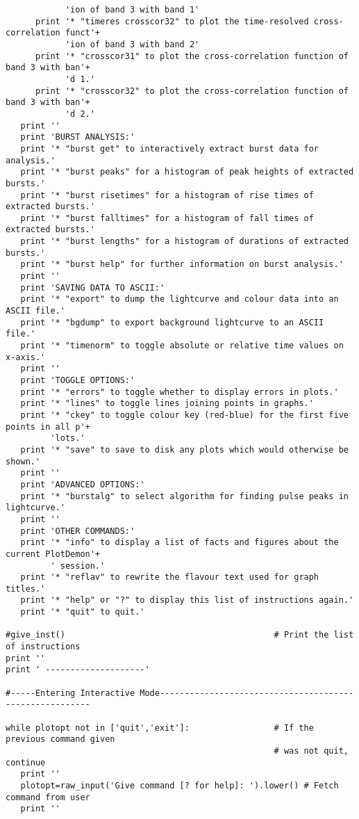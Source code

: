 \begin{verbatim}
            'ion of band 3 with band 1'
      print '* "timeres crosscor32" to plot the time-resolved cross-correlation funct'+
            'ion of band 3 with band 2'
      print '* "crosscor31" to plot the cross-correlation function of band 3 with ban'+
            'd 1.'
      print '* "crosscor32" to plot the cross-correlation function of band 3 with ban'+
            'd 2.'
   print ''
   print 'BURST ANALYSIS:'
   print '* "burst get" to interactively extract burst data for analysis.'
   print '* "burst peaks" for a histogram of peak heights of extracted bursts.'
   print '* "burst risetimes" for a histogram of rise times of extracted bursts.'
   print '* "burst falltimes" for a histogram of fall times of extracted bursts.'
   print '* "burst lengths" for a histogram of durations of extracted bursts.'
   print '* "burst help" for further information on burst analysis.'
   print ''
   print 'SAVING DATA TO ASCII:'
   print '* "export" to dump the lightcurve and colour data into an ASCII file.'
   print '* "bgdump" to export background lightcurve to an ASCII file.'
   print '* "timenorm" to toggle absolute or relative time values on x-axis.'
   print ''
   print 'TOGGLE OPTIONS:'
   print '* "errors" to toggle whether to display errors in plots.'
   print '* "lines" to toggle lines joining points in graphs.'
   print '* "ckey" to toggle colour key (red-blue) for the first five points in all p'+
         'lots.'
   print '* "save" to save to disk any plots which would otherwise be shown.'
   print ''
   print 'ADVANCED OPTIONS:'
   print '* "burstalg" to select algorithm for finding pulse peaks in lightcurve.'
   print ''
   print 'OTHER COMMANDS:'
   print '* "info" to display a list of facts and figures about the current PlotDemon'+
         ' session.'
   print '* "reflav" to rewrite the flavour text used for graph titles.'
   print '* "help" or "?" to display this list of instructions again.'
   print '* "quit" to quit.'

#give_inst()                                          # Print the list of instructions
print ''
print ' --------------------'

#-----Entering Interactive Mode--------------------------------------------------------

while plotopt not in ['quit','exit']:                 # If the previous command given
                                                      # was not quit, continue
   print ''
   plotopt=raw_input('Give command [? for help]: ').lower() # Fetch command from user
   print ''


\end{verbatim}
